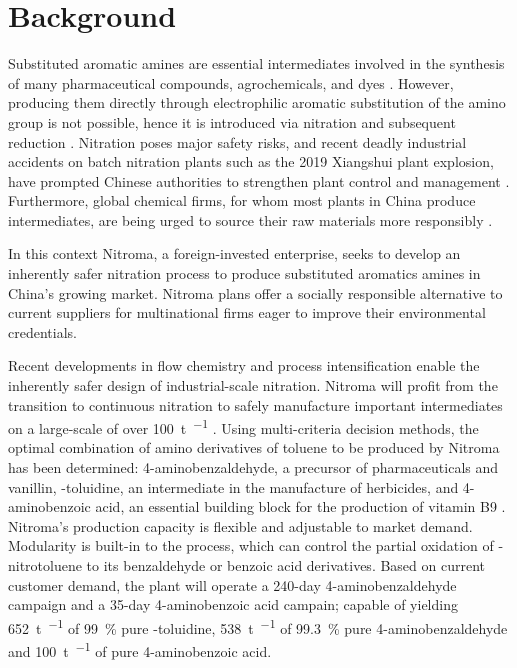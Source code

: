 \section*{Background}

Substituted aromatic amines are essential intermediates involved in the synthesis of many pharmaceutical compounds, agrochemicals, and dyes \cite{vogt_amines_2000}. However, producing them directly through electrophilic aromatic substitution of the amino group is not possible, hence it is introduced via nitration and subsequent reduction \cite{dugal_nitrobenzene_2005}. Nitration poses major safety risks, and recent deadly industrial accidents on batch nitration plants such as the 2019 Xiangshui plant explosion, have prompted Chinese authorities to strengthen plant control and management \cite{el_diario_china_2019}. Furthermore, global chemical firms, for whom most plants in China produce intermediates, are being urged to source their raw materials more responsibly \cite{stanway_global_2019}.

In this context Nitroma, a foreign-invested enterprise, seeks to develop an inherently safer nitration process to produce substituted aromatics amines in China's growing market. Nitroma plans offer a socially responsible alternative to current suppliers for multinational firms eager to improve their environmental credentials. 

Recent developments in flow chemistry and process intensification enable the inherently safer design of industrial-scale nitration. Nitroma will profit from the transition to continuous nitration to safely manufacture important intermediates on a large-scale of over \SI{100}{\tonne\per\year} \cite{di_miceli_raimondi_safety_2015}. Using multi-criteria decision methods, the optimal combination of amino derivatives of toluene to be produced by Nitroma has been determined: 4-aminobenzaldehyde, a precursor of pharmaceuticals and vanillin, \ortho-toluidine, an intermediate in the manufacture of herbicides, and 4-aminobenzoic acid, an essential building block for the production of vitamin B9 \cite{bowers_toluidines_2000,bruhne_benzaldehyde_2011,maki_benzoic_2000}.
Nitroma's production capacity is flexible and adjustable to market demand. Modularity is built-in to the process, which can control the partial oxidation of \para-nitrotoluene to its benzaldehyde or benzoic acid derivatives. Based on current customer demand, the plant will operate a 240-day 4-aminobenzaldehyde campaign and a 35-day 4-aminobenzoic acid campain; capable of yielding \SI{652}{\tonne\per\year} of \SI{99}{\percent} pure \ortho-toluidine, \SI{538}{\tonne\per\year} of \SI{99.3}{\percent} pure 4-aminobenzaldehyde and \SI{100}{\tonne\per\year} of pure 4-aminobenzoic acid.

